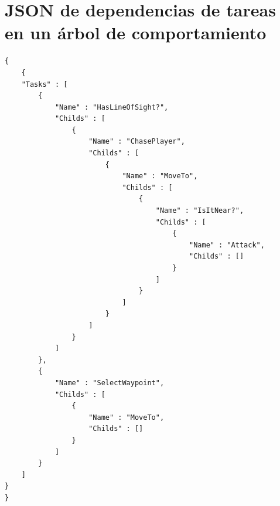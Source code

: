 \chapter{JSON de dependencias de tareas en un árbol de comportamiento}
\label{appendix:Orden}

\begin{lstlisting}[style = json, caption={Ejemplo del formato que deben seguir los JSON con el órden de dependencias de tareas}, label={lst:especDepen}]
{
    {
    "Tasks" : [
        {
            "Name" : "HasLineOfSight?",
            "Childs" : [
                {
                    "Name" : "ChasePlayer",
                    "Childs" : [
                        {
                            "Name" : "MoveTo",
                            "Childs" : [
                                {
                                    "Name" : "IsItNear?",
                                    "Childs" : [
                                        {
                                            "Name" : "Attack",
                                            "Childs" : []
                                        }
                                    ]
                                }
                            ]
                        }
                    ]
                }
            ]
        },
        {
            "Name" : "SelectWaypoint",
            "Childs" : [
                {
                    "Name" : "MoveTo",
                    "Childs" : []
                }
            ]
        }
    ]
}
}
\end{lstlisting}